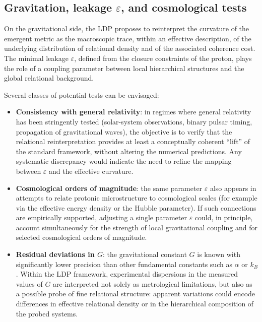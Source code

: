 \documentclass[11pt,a4paper]{article}
\begin{document}
\subsection{Gravitation, leakage \texorpdfstring{\(\varepsilon\)}{ε}, and cosmological tests}
On the gravitational side, the LDP proposes to reinterpret the curvature of the emergent metric as the macroscopic trace, within an effective description, of the underlying distribution of relational density and of the associated coherence cost. The minimal leakage \(\varepsilon\), defined from the closure constraints of the proton, plays the role of a coupling parameter between local hierarchical structures and the global relational background.

Several classes of potential tests can be envisaged:
\begin{itemize}[label=-]
    \item \textbf{Consistency with general relativity}: in regimes where general relativity has been stringently tested (solar-system observations, binary pulsar timing, propagation of gravitational waves), the objective is to verify that the relational reinterpretation provides at least a conceptually coherent “lift” of the standard framework, without altering the numerical predictions. Any systematic discrepancy would indicate the need to refine the mapping between \(\varepsilon\) and the effective curvature.
    \item \textbf{Cosmological orders of magnitude}: the same parameter \(\varepsilon\) also appears in attempts to relate protonic microstructure to cosmological scales (for example via the effective energy density or the Hubble parameter). If such connections are empirically supported, adjusting a single parameter \(\varepsilon\) could, in principle, account simultaneously for the strength of local gravitational coupling and for selected cosmological orders of magnitude.
    \item \textbf{Residual deviations in \(G\)}: the gravitational constant \(G\) is known with significantly lower precision than other fundamental constants such as \(\alpha\) or \(k_{B}\). Within the LDP framework, experimental dispersions in the measured values of \(G\) are interpreted not solely as metrological limitations, but also as a possible probe of fine relational structure: apparent variations could encode differences in effective relational density or in the hierarchical composition of the probed systems.
\end{itemize}
\end{document}
